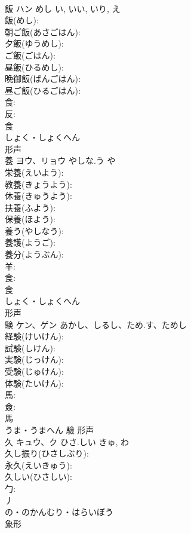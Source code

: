 \documentclass[8pt]{extreport}
\begin{document}
\begin{CJK}{UTF8}{min}
\\	飯	ハン	めし	い, いい, いり, え	
\\	飯(めし): 
\\	朝ご飯(あさごはん): 
\\	夕飯(ゆうめし): 
\\	ご飯(ごはん): 
\\	昼飯(ひるめし): 
\\	晩御飯(ばんごはん): 
\\	昼ご飯(ひるごはん): 
\\	食: 
\\	反: 
\\	食	
\\	しょく・しょくへん	
\\	形声 
\\	養	ヨウ、リョウ	やしな.う	や	
\\	栄養(えいよう): 
\\	教養(きょうよう): 
\\	休養(きゅうよう): 
\\	扶養(ふよう): 
\\	保養(ほよう): 
\\	養う(やしなう): 
\\	養護(ようご): 
\\	養分(ようぶん): 
\\	羊: 
\\	食: 
\\	食	
\\	しょく・しょくへん	
\\	形声 
\\	験	ケン、ゲン	あかし、しるし、ため.す、ためし		
\\	経験(けいけん): 
\\	試験(しけん): 
\\	実験(じっけん): 
\\	受験(じゅけん): 
\\	体験(たいけん): 
\\	馬: 
\\	僉: 
\\	馬	
\\	うま・うまへん	驗	形声 
\\	久	キュウ、ク	ひさ.しい	きゅ, わ	
\\	久し振り(ひさしぶり): 
\\	永久(えいきゅう): 
\\	久しい(ひさしい): 
\\	勹: 
\\	丿	
\\	の・のかんむり・はらいぼう	
\\	象形 

\end{CJK}
\end{document}
